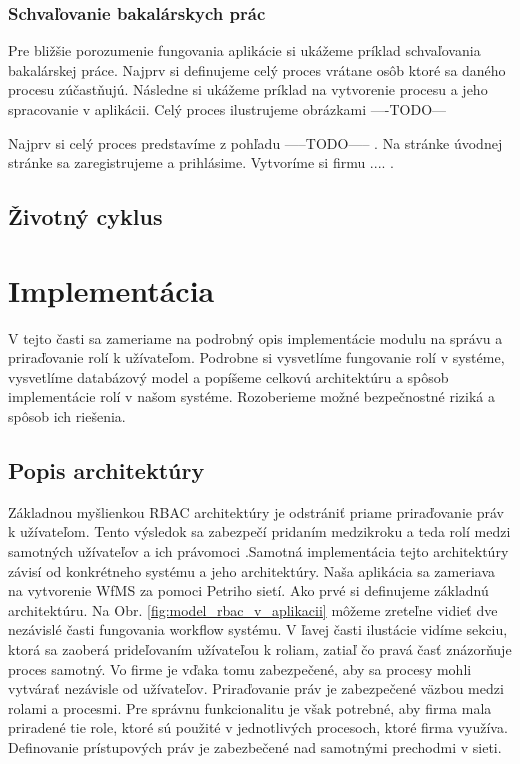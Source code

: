 	\subsubsection{Schvaľovanie bakalárskych prác}
	Pre bližšie porozumenie fungovania aplikácie si ukážeme príklad schvaľovania bakalárskej práce. Najprv si definujeme celý proces vrátane osôb ktoré sa daného procesu zúčastňujú. Následne si ukážeme príklad na vytvorenie procesu a jeho spracovanie v aplikácii. Celý proces ilustrujeme obrázkami 
	----TODO---
	
	Najprv si celý proces predstavíme z pohľadu -----TODO----- . Na stránke úvodnej stránke sa zaregistrujeme a prihlásime. Vytvoríme si firmu .... . 
		
	
	\subsection{Životný cyklus}
	

\section{Implementácia}
V tejto časti sa zameriame na podrobný opis implementácie modulu na správu a priraďovanie rolí k užívateľom. Podrobne si vysvetlíme fungovanie rolí v systéme, vysvetlíme databázový model a popíšeme celkovú architektúru a spôsob implementácie rolí v našom systéme. Rozoberieme možné bezpečnostné riziká a spôsob ich riešenia.

	\subsection{Popis architektúry}
	Základnou myšlienkou RBAC architektúry je odstrániť priame priraďovanie práv k užívateľom. Tento výsledok sa zabezpečí pridaním medzikroku a teda rolí medzi samotných užívateľov a ich právomoci .Samotná implementácia tejto architektúry závisí od konkrétneho systému a jeho architektúry. Naša aplikácia sa zameriava na vytvorenie WfMS za pomoci Petriho sietí. Ako prvé si definujeme základnú architektúru. Na Obr. \ref{fig:model_rbac_v_aplikacii} môžeme zreteľne vidieť dve nezávislé časti fungovania workflow systému. V ľavej časti ilustácie vidíme sekciu, ktorá sa zaoberá  prideľovaním  užívateľou k roliam, zatiaľ čo pravá časť znázorňuje proces samotný. Vo firme je vďaka tomu zabezpečené, aby sa procesy mohli vytvárať nezávisle od užívateľov. Priraďovanie práv je zabezpečené väzbou medzi rolami a procesmi. Pre správnu funkcionalitu je však potrebné, aby firma mala priradené tie role, ktoré sú použité v jednotlivých procesoch, ktoré firma využíva. Definovanie prístupových práv je zabezbečené nad samotnými prechodmi v sieti.
	

